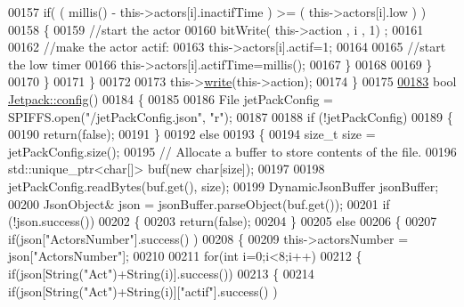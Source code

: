 \begin{DoxyCode}
00157                 \textcolor{keywordflow}{if}( ( millis() - this->actors[i].inactifTime ) >= ( this->actors[i].low  ) )
00158                 \{
00159                     \textcolor{comment}{//start the actor}
00160                     bitWrite( this->action , i , 1) ;
00161 
00162                     \textcolor{comment}{//make the actor actif:}
00163                     this->actors[i].actif=1;
00164 
00165                     \textcolor{comment}{//start the low timer}
00166                     this->actors[i].actifTime=millis();             
00167                 \}           
00168             
00169             \}
00170         \}
00171     \}
00172 
00173     this->\hyperlink{class_jetpack_a338f1af8cbc6504ac69b47c7328569b5}{write}(this->action);
00174 \}
00175 
\hyperlink{class_jetpack_ab065ee83e244265a2223a22f3ee4a719}{00183} \textcolor{keywordtype}{bool} \hyperlink{class_jetpack_ab065ee83e244265a2223a22f3ee4a719}{Jetpack::config}()
00184 \{
00185 
00186     File jetPackConfig = SPIFFS.open(\textcolor{stringliteral}{"/jetPackConfig.json"}, \textcolor{stringliteral}{"r"});
00187 
00188     \textcolor{keywordflow}{if} (!jetPackConfig) 
00189     \{
00190         \textcolor{keywordflow}{return}(\textcolor{keyword}{false});
00191     \}
00192     \textcolor{keywordflow}{else}
00193     \{
00194         \textcolor{keywordtype}{size\_t} size = jetPackConfig.size();
00195         \textcolor{comment}{// Allocate a buffer to store contents of the file.}
00196         std::unique\_ptr<char[]> buf(\textcolor{keyword}{new} \textcolor{keywordtype}{char}[size]);
00197 
00198         jetPackConfig.readBytes(buf.get(), size);
00199         DynamicJsonBuffer jsonBuffer;
00200         JsonObject& json = jsonBuffer.parseObject(buf.get());
00201         \textcolor{keywordflow}{if} (!json.success()) 
00202         \{
00203               \textcolor{keywordflow}{return}(\textcolor{keyword}{false});
00204         \} 
00205         \textcolor{keywordflow}{else}
00206         \{     
00207             \textcolor{keywordflow}{if}(json[\textcolor{stringliteral}{"ActorsNumber"}].success() )
00208             \{
00209                 this->actorsNumber = json[\textcolor{stringliteral}{"ActorsNumber"}]; 
00210             
00211                 \textcolor{keywordflow}{for}(\textcolor{keywordtype}{int} i=0;i<8;i++)
00212                 \{   \textcolor{keywordflow}{if}(json[String(\textcolor{stringliteral}{"Act"})+String(i)].success())
00213                     \{
00214                         \textcolor{keywordflow}{if}(json[String(\textcolor{stringliteral}{"Act"})+String(i)][\textcolor{stringliteral}{"actif"}].success() )

\end{DoxyCode}
